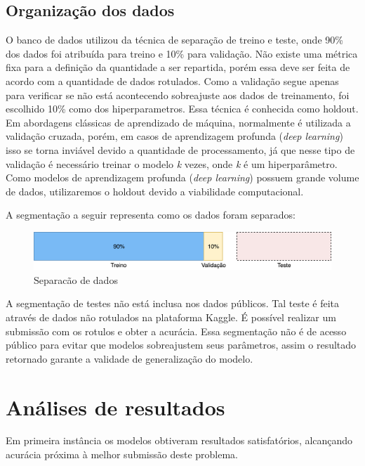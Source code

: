 \documentclass[12pt]{article}
\begin{document}
\subsection{Organização dos dados}

O banco de dados utilizou da técnica de separação de treino e teste, onde 90\% dos dados foi atribuída para treino e 10\% para validação. Não existe uma métrica fixa para a definição da quantidade a ser repartida, porém essa deve ser feita de acordo com a quantidade de dados rotulados. Como a validação segue apenas para verificar se não está acontecendo sobreajuste aos dados de treinamento, foi escolhido 10\% como dos hiperparametros. Essa técnica é conhecida como holdout. Em abordagens clássicas de aprendizado de máquina, normalmente é utilizada a validação cruzada, porém, em casos de aprendizagem profunda (\textit{deep learning}) isso se torna inviável devido a quantidade de processamento, já que nesse tipo de validação é necessário treinar o modelo \textit{k} vezes, onde \textit{k} é um hiperparâmetro. Como modelos de aprendizagem profunda (\textit{deep learning}) possuem grande volume de dados, utilizaremos o holdout devido a viabilidade computacional.

A segmentação a seguir representa como os dados foram separados:

\begin{figure}[!htb]
\centering
\includegraphics[width=1\textwidth]{images/datasplit.png}
\caption{Separacão de dados}
\label{fig:datasplit}
\end{figure}

A segmentação de testes não está inclusa nos dados públicos. Tal teste é feita através de dados não rotulados na plataforma Kaggle. É possível realizar um submissão com os rotulos e obter a acurácia. Essa segmentação não é de acesso público para evitar que modelos sobreajustem seus parâmetros, assim o resultado retornado garante a validade de generalização do modelo.

\section{Análises de resultados}

Em primeira instância os modelos obtiveram resultados satisfatórios, alcançando acurácia próxima à melhor submissão deste problema.
\end{document}
